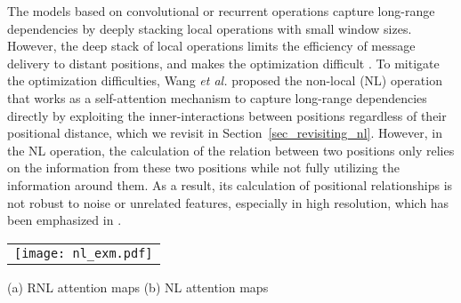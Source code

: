 \documentclass[a4paper,conference]{IEEEtran}
\begin{document}
The models based on convolutional or recurrent operations capture long-range dependencies by deeply stacking local operations with small window sizes. However, the deep stack of local operations limits the efficiency of message delivery to distant positions, and makes the optimization difficult \cite{he2016deep, hochreiter1997long}. To mitigate the optimization difficulties, Wang {\em et al.} proposed the non-local (NL) operation \cite{wang2018non} that works as a self-attention mechanism \cite{vaswani2017attention} to capture long-range dependencies directly by exploiting the inner-interactions between positions regardless of their positional distance, which we revisit in Section~\ref{sec_revisiting_nl}. However, in the NL operation, the calculation of the relation between two positions only relies on the information from these two positions while not fully utilizing the information around them. As a result, its calculation of positional relationships is not robust to noise or unrelated features, especially in high resolution, which has been emphasized in \cite{buades2005non}.  

\begin{figure*}
  \centering
  \begin{tabular}{l}
    \texttt{[image: nl\_exm.pdf]}
  \end{tabular}
(a) RNL attention maps \hspace{6cm} (b) NL attention maps
  \caption{Examples of visualizing the attention maps of RNL and NL operations in the res4 stage of ResNet on a video clip from Kinetics-400. Given a reference position, an ideal non-local operation should only highlight the regions related to the reference position. In the same video clip, the NL operation has almost the same attention maps at different reference positions while the proposed RNL operation presents query-specific attention maps, which demonstrate that the proposed RNL operation can better compute the relationships between positions.}
\label{fig:example_nl}
\end{figure*}
\end{document}
